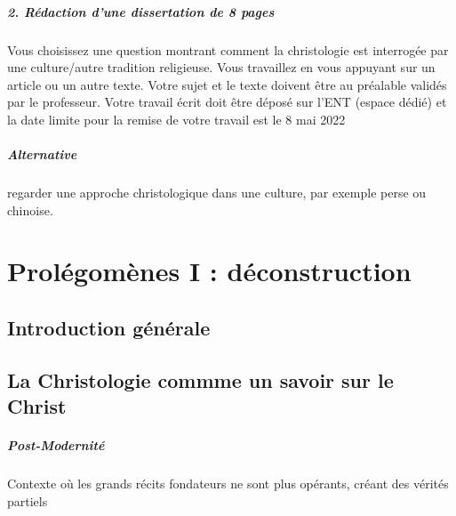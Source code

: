 \paragraph{2. Rédaction d’une dissertation de 8 pages}
Vous choisissez une question montrant comment la christologie est interrogée par une
culture/autre tradition religieuse. Vous travaillez en vous appuyant sur un article ou un autre
texte.
Votre sujet et le texte doivent être au préalable validés par le professeur.
Votre travail écrit doit être déposé sur l’ENT (espace dédié) et la date limite pour la
remise de votre travail est le 8 mai 2022

\paragraph{Alternative} regarder une approche christologique dans une culture, par exemple perse ou chinoise. 
\chapter{Prolégomènes I : déconstruction}

\section{Introduction générale}

\section{La Christologie commme un savoir sur le Christ}
\paragraph{Post-Modernité}
\begin{Def}
Contexte où les grands récits fondateurs ne sont plus opérants, créant des vérités partiels
\end{Def}

